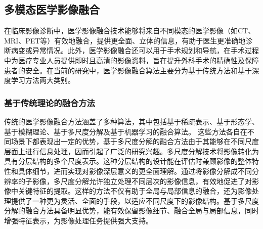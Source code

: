 \subsection{多模态医学影像融合}
在临床影像诊断中，医学影像融合技术能够将来自不同模态的医学影像（如CT、MRI、PET等）有效地融合，提供更全面、立体的信息，有助于医生更准确地诊断病变或异常情况。此外，医学影像融合还可以用于手术规划和导航，在手术过程中为医疗专业人员提供即时且高清的影像资料，旨在提升外科手术的精确性及保障患者的安全。在当前的研究中，医学影像融合算法主要分为基于传统方法和基于深度学习方法两大类别。


\subsubsection{基于传统理论的融合方法}
传统的医学影像融合方法涵盖了多种算法，其中包括基于稀疏表示\cite{liu2015general,maqsood2020multi,li2021medical}、基于形态学\cite{matsopoulos1994multiresolution,mukhopadhyay2001fusion,liu2019medical}、基于模糊理论\cite{ali2015multi,hu2021fuzzy,velmurugan2018multimodality}、基于多尺度分解\cite{jin2016medical,li2017pixel,singh2014fusion,yin2018medical}及基于机器学习的融合算法\cite{jasti2022computational,raja2020artificial,alseelawi2022novel,tang2019augmentation,diwakar2021latest}。
这些方法各自在不同场景下都表现出一定的优势，基于多尺度分解的融合方法由于其能够在不同尺度层面上进行信息处理，因而引起了广泛的研究兴趣。多尺度分解技术将影像转化为具有分层结构的多个尺度表示。这种分层结构的设计能在评估时兼顾影像的整体特性和具体细节，进而实现对影像深层意义的更全面理解。通过将影像分解成不同分辨率的子影像，多尺度分解允许独立处理不同层次的影像信息，有效地促进了对影像中关键特征的提取。这样的方法不仅有助于全局与局部信息的融合，还为影像处理提供了一种更为灵活、全面的手段，以适应不同尺度下的影像结构。基于多尺度分解的融合方法具备明显优势，能有效保留影像细节、融合全局与局部信息，同时增强特征表示，为影像处理任务提供强大支持。

